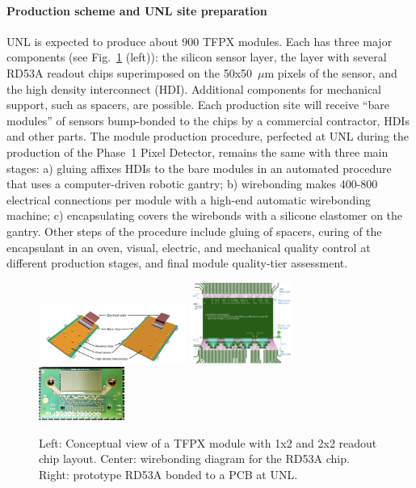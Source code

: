 \paragraph{Production scheme and UNL site preparation}

UNL is expected to produce about 900 TFPX modules. Each  has three major components (see Fig.~\ref{fig:TFPXmodule} (left)): the silicon sensor layer, the layer with several RD53A readout chips superimposed on the 50x50~$\mu$m pixels of the sensor, and the high density interconnect (HDI). Additional components for mechanical support, such as spacers, are possible. Each production site will receive ``bare modules'' of sensors bump-bonded to the chips by a commercial contractor, HDIs and other parts. The module production procedure, perfected at UNL during the production of the Phase~1 Pixel Detector, remains the same with three main stages: a) gluing affixes HDIs to the bare modules in an automated procedure that uses a computer-driven robotic gantry; b) wirebonding makes 400-800 electrical connections per module with a high-end automatic wirebonding machine; c) encapsulating covers the wirebonds with a silicone elastomer on the gantry. Other steps of the  procedure include gluing of spacers, curing of the encapsulant in an oven, visual, electric, and mechanical quality control at different production stages, and final module quality-tier assessment.

\begin{figure}
\centering\includegraphics[width=0.43\textwidth]{figs/phase2_pixel_module_lowres.png}
\centering\includegraphics[width=0.30\textwidth]{figs/RD53A_wirebonding_diagram.png}
\centering\includegraphics[width=0.25\textwidth]{figs/RD53A_bonded_chip.png}
\caption{\label{fig:TFPXmodule} Left: Conceptual view of a TFPX module with 1x2 and 2x2 readout chip layout. Center: wirebonding diagram for the RD53A chip. Right: prototype RD53A bonded to a PCB at UNL.}
\end{figure}

